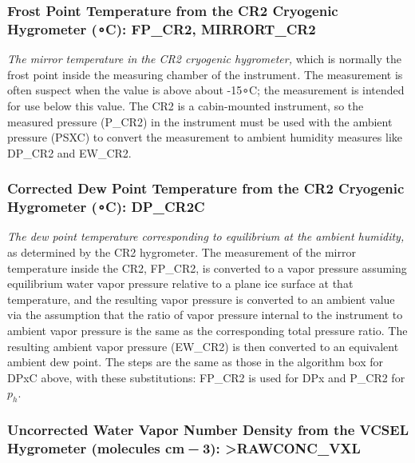 \documentclass[
  english,
]{book}
\begin{document}
\hypertarget{mirror-cr2}{%
\subsubsection*{\texorpdfstring{Frost Point Temperature from the CR2
Cryogenic Hygrometer ({∘}C): FP\_CR2,
MIRRORT\_CR2}{Frost Point Temperature from the CR2 Cryogenic Hygrometer (∘C): FP\_CR2, MIRRORT\_CR2}}\label{mirror-cr2}}

\emph{The mirror temperature in the CR2 cryogenic hygrometer,} which is
normally the frost point inside the measuring chamber of the
instrument\emph{.} The measurement is often suspect when the value is
above about -15{∘}C; the measurement is intended for use below this
value. The CR2 is a cabin-mounted instrument, so the measured pressure
(P\_CR2) in the instrument must be used with the ambient pressure (PSXC)
to convert the measurement to ambient humidity measures like DP\_CR2 and
EW\_CR2.

\hypertarget{dp-cr2}{%
\subsubsection*{\texorpdfstring{Corrected Dew Point Temperature from the
CR2 Cryogenic Hygrometer ({∘}C):
DP\_CR2C}{Corrected Dew Point Temperature from the CR2 Cryogenic Hygrometer (∘C): DP\_CR2C}}\label{dp-cr2}}

\emph{The dew point temperature corresponding to equilibrium at the
ambient humidity,} as determined by the CR2 hygrometer. The measurement
of the mirror temperature inside the CR2, FP\_CR2, is converted to a
vapor pressure assuming equilibrium water vapor pressure relative to a
plane ice surface at that temperature, and the resulting vapor pressure
is converted to an ambient value via the assumption that the ratio of
vapor pressure internal to the instrument to ambient vapor pressure is
the same as the corresponding total pressure ratio. The resulting
ambient vapor pressure (EW\_CR2) is then converted to an equivalent
ambient dew point. The steps are the same as those in the algorithm box
for DPxC above, with these substitutions: FP\_CR2 is used for DPx and
P\_CR2 for \(p_h\).

\hypertarget{vcsel-uncor}{%
\subsubsection*{\texorpdfstring{Uncorrected Water Vapor Number Density
from the VCSEL Hygrometer (molecules cm{ − 3}):
\textgreater RAWCONC\_VXL}{Uncorrected Water Vapor Number Density from the VCSEL Hygrometer (molecules cm − 3): \textgreater RAWCONC\_VXL}}\label{vcsel-uncor}}
\end{document}
